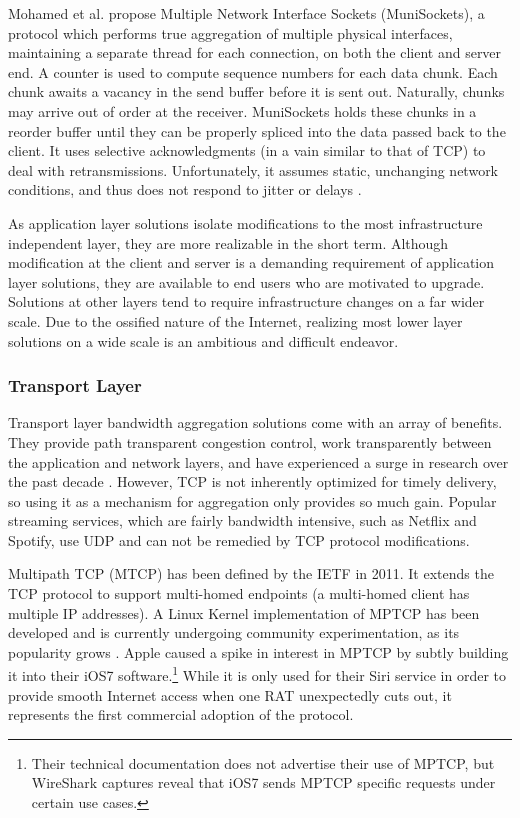 \documentclass[12pt]{article}
\begin{document}
		Mohamed et al. propose Multiple Network Interface Sockets (MuniSockets), a protocol which performs true aggregation of multiple physical interfaces, maintaining a separate thread for each connection, on both the client and server end. A counter is used to compute sequence numbers for each data chunk. Each chunk awaits a vacancy in the send buffer before it is sent out. Naturally, chunks may arrive out of order at the receiver. MuniSockets holds these chunks in a reorder buffer until they can be properly spliced into the data passed back to the client. It uses selective acknowledgments (in a vain similar to that of TCP) to deal with retransmissions. Unfortunately, it assumes static, unchanging network conditions, and thus does not respond to jitter or delays \cite{mohamed2002user}.

		As application layer solutions isolate modifications to the most infrastructure independent layer, they are more realizable in the short term. Although modification at the client and server is a demanding requirement of application layer solutions, they are available to end users who are motivated to upgrade. Solutions at other layers tend to require infrastructure changes on a far wider scale. Due to the ossified nature of the Internet, realizing most lower layer solutions on a wide scale is an ambitious and difficult endeavor.

	\subsubsection{Transport Layer}

		Transport layer bandwidth aggregation solutions come with an array of benefits. They provide path transparent congestion control, work transparently between the application and network layers, and have experienced a surge in research over the past decade \cite{5763587}. However, TCP is not inherently optimized for timely delivery, so using it as a mechanism for aggregation only provides so much gain. Popular streaming services, which are fairly bandwidth intensive, such as Netflix and Spotify, use UDP and can not be remedied by TCP protocol modifications.

		Multipath TCP (MTCP) has been defined by the IETF in 2011. It extends the TCP protocol to support multi-homed endpoints (a multi-homed client has multiple IP addresses). A Linux Kernel implementation of MPTCP has been developed and is currently undergoing community experimentation, as its popularity grows \cite{barre2011multipath}. Apple caused a spike in interest in MPTCP by subtly building it into their iOS7 software.\footnote{Their technical documentation does not advertise their use of MPTCP, but WireShark captures reveal that iOS7 sends MPTCP specific requests under certain use cases.} While it is only used for their Siri service in order to provide smooth Internet access when one RAT unexpectedly cuts out, it represents the first commercial adoption of the protocol.
\end{document}
